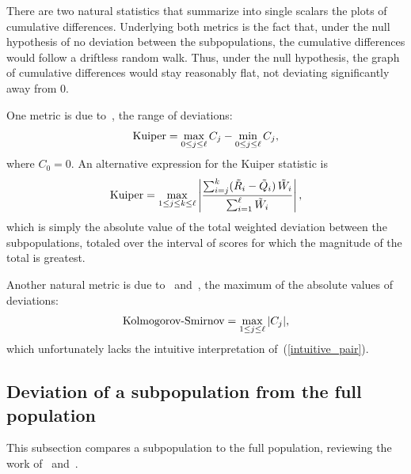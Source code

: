\documentclass[]{fairmeta}
\begin{document}
There are two natural statistics that summarize into single scalars the plots
of cumulative differences. Underlying both metrics is the fact that,
under the null hypothesis of no deviation between the subpopulations, 
the cumulative differences would follow a driftless random walk.
Thus, under the null hypothesis, the graph of cumulative differences
would stay reasonably flat, not deviating significantly away from 0.

One metric is due to~\cite{kuiper}, the range of deviations:
%
\begin{equation}
{\rm Kuiper} = \max_{0 \le j \le \ell} C_j - \min_{0 \le j \le \ell} C_j,
\end{equation}
%
where $C_0 = 0$.
An alternative expression for the Kuiper statistic is
%
\begin{equation}
\label{intuitive_pair}
{\rm Kuiper} = \max_{1 \le j \le k \le \ell}
\left| \frac{\sum_{i=j}^k (\tilde{R}_i - \tilde{Q}_i) \, \tilde{W}_i}
            {\sum_{i=1}^{\ell} \tilde{W}_i} \right|,
\end{equation}
%
which is simply the absolute value of the total weighted deviation
between the subpopulations, totaled over the interval of scores
for which the magnitude of the total is greatest.

Another natural metric is due to~\cite{kolmogorov} and~\cite{smirnov},
the maximum of the absolute values of deviations:
%
\begin{equation}
\hbox{Kolmogorov-Smirnov} = \max_{1 \le j \le \ell} |C_j|,
\end{equation}
%
which unfortunately lacks the intuitive interpretation
of~(\ref{intuitive_pair}).


\subsection{Deviation of a subpopulation from the full population}
\label{sub_vs_full}

This subsection compares a subpopulation to the full population,
reviewing the work of~\cite{tygert_full} and~\cite{tygert_pvals}.
\end{document}
